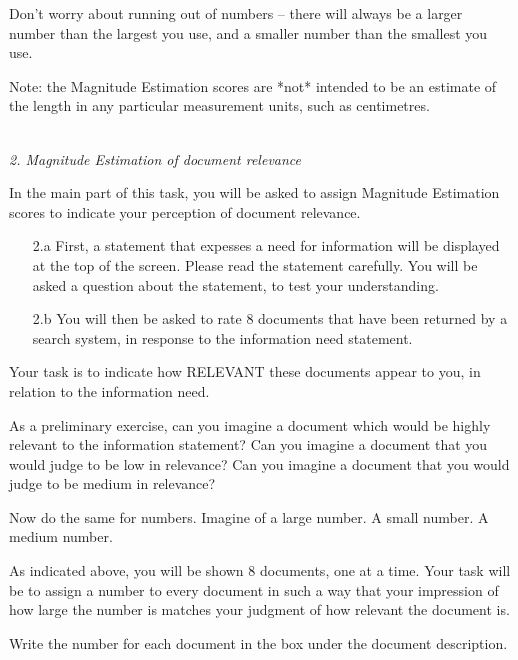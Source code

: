 Don’t worry about running out of numbers -- there will always be a
larger number than the largest you use, and a smaller number than the
smallest you use.

Note: the Magnitude Estimation scores are *not* intended to be an
estimate of the length in any particular measurement units, such as
centimetres.

~\\

\noindent \emph{2. Magnitude Estimation of document relevance}

In the main part of this task, you will be asked to assign Magnitude
Estimation scores to indicate your perception of document
relevance. 

\begin{itemize}
\item[2.a] First, a statement that expesses a need for information will be
displayed at the top of the screen.  Please read the statement
carefully.  You will be asked a question about the statement, to test
your understanding.

\item[2.b] You will then be asked to rate 8 documents that have been returned
by a search system, in response to the information need statement.
\end{itemize}

Your task is to indicate how RELEVANT these documents appear to you, in
relation to the information need. 

As a preliminary exercise, can you imagine a document which would be
highly relevant to the information statement? Can you imagine a document
that you would judge to be low in relevance? Can you imagine a document
that you would judge to be medium in relevance? 

Now do the same for numbers. Imagine of a large number. A small
number. A medium number.

As indicated above, you will be shown 8 documents, one at a time. Your
task will be to assign a number to every document in such a way that
your impression of how large the number is matches your judgment of how
relevant the document is. 

Write the number for each document in the box under the document
description.  

